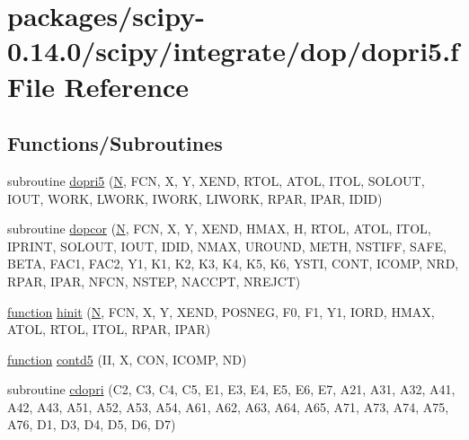 \hypertarget{dopri5_8f}{}\section{packages/scipy-\/0.14.0/scipy/integrate/dop/dopri5.f File Reference}
\label{dopri5_8f}
\subsection*{Functions/\+Subroutines}
\begin{DoxyCompactItemize}
\item 
subroutine \hyperlink{dopri5_8f_ae268581aab440a5d080ac87d6eb01bd8}{dopri5} (\hyperlink{polmisc_8c_a0240ac851181b84ac374872dc5434ee4}{N}, F\+C\+N, X, Y, X\+E\+N\+D, R\+T\+O\+L, A\+T\+O\+L, I\+T\+O\+L, S\+O\+L\+O\+U\+T, I\+O\+U\+T, W\+O\+R\+K, L\+W\+O\+R\+K, I\+W\+O\+R\+K, L\+I\+W\+O\+R\+K, R\+P\+A\+R, I\+P\+A\+R, I\+D\+I\+D)
\item 
subroutine \hyperlink{dopri5_8f_ac65591d61bc9c55318e4d90f33726627}{dopcor} (\hyperlink{polmisc_8c_a0240ac851181b84ac374872dc5434ee4}{N}, F\+C\+N, X, Y, X\+E\+N\+D, H\+M\+A\+X, H, R\+T\+O\+L, A\+T\+O\+L, I\+T\+O\+L, I\+P\+R\+I\+N\+T, S\+O\+L\+O\+U\+T, I\+O\+U\+T, I\+D\+I\+D, N\+M\+A\+X, U\+R\+O\+U\+N\+D, M\+E\+T\+H, N\+S\+T\+I\+F\+F, S\+A\+F\+E, B\+E\+T\+A, F\+A\+C1, F\+A\+C2, Y1, K1, K2, K3, K4, K5, K6, Y\+S\+T\+I, C\+O\+N\+T, I\+C\+O\+M\+P, N\+R\+D, R\+P\+A\+R, I\+P\+A\+R, N\+F\+C\+N, N\+S\+T\+E\+P, N\+A\+C\+C\+P\+T, N\+R\+E\+J\+C\+T)
\item 
\hyperlink{afunc_8m_a7b5e596df91eadea6c537c0825e894a7}{function} \hyperlink{dopri5_8f_a304e4cdfa078934e9f0c18634a670a79}{hinit} (\hyperlink{polmisc_8c_a0240ac851181b84ac374872dc5434ee4}{N}, F\+C\+N, X, Y, X\+E\+N\+D, P\+O\+S\+N\+E\+G, F0, F1, Y1, I\+O\+R\+D, H\+M\+A\+X, A\+T\+O\+L, R\+T\+O\+L, I\+T\+O\+L, R\+P\+A\+R, I\+P\+A\+R)
\item 
\hyperlink{afunc_8m_a7b5e596df91eadea6c537c0825e894a7}{function} \hyperlink{dopri5_8f_a7f29e020f09ac1bafac5e2349c52aa6f}{contd5} (I\+I, X, C\+O\+N, I\+C\+O\+M\+P, N\+D)
\item 
subroutine \hyperlink{dopri5_8f_ae160aa9d87e9bc73d4908ae758f26fd7}{cdopri} (C2, C3, C4, C5, E1, E3, E4, E5, E6, E7, A21, A31, A32, A41, A42, A43, A51, A52, A53, A54, A61, A62, A63, A64, A65, A71, A73, A74, A75, A76, D1, D3, D4, D5, D6, D7)
\end{DoxyCompactItemize}


